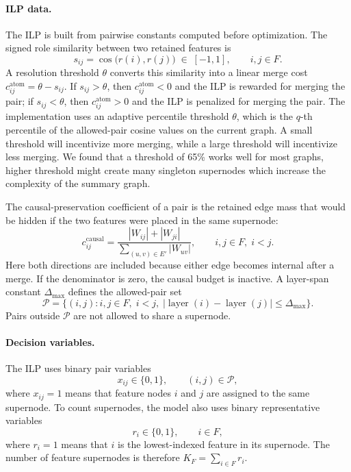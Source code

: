 \documentclass[../main.tex]{subfiles}
\begin{document}
\paragraph{ILP data.}
The ILP is built from pairwise constants computed before optimization. The signed
role similarity between two retained features is
\begin{equation}
s_{ij} =
\cos\bigl(r(i), r(j)\bigr)
\;\in\; [-1,1],
\qquad i,j \in F.
\label{eq:sim}
\end{equation}
A resolution threshold $\theta$ converts this similarity into a linear merge cost
$c^{\text{atom}}_{ij} = \theta - s_{ij}$. If $s_{ij} > \theta$, then
$c^{\text{atom}}_{ij} < 0$ and the ILP is rewarded for merging the pair; if
$s_{ij} < \theta$, then $c^{\text{atom}}_{ij} > 0$ and the ILP is penalized for
merging the pair. The implementation uses an adaptive percentile threshold $\theta$, 
which is the $q$-th percentile of the allowed-pair cosine values on the current graph.
A small threshold will incentivize more merging, while a large threshold will incentivize less merging.
We found that a threshold of 65\% works well for most graphs, higher threshold might create many singleton supernodes which increase the complexity of the summary graph.

The causal-preservation coefficient of a pair is the retained edge mass that would
be hidden if the two features were placed in the same supernode:
\begin{equation}
c^{\text{causal}}_{ij}
=
\frac{|W_{ij}| + |W_{ji}|}
     {\sum_{(u,v)\in E'} |W_{uv}|},
\qquad i,j \in F,\; i<j.
\label{eq:causal-coeff}
\end{equation}
Here both directions are included because either edge becomes internal after a
merge. If the denominator is zero, the causal budget is inactive. A layer-span
constant $\Delta_{\max}$ defines the allowed-pair set
\begin{equation}
\mathcal{P}
=
\{(i,j): i,j \in F,\; i<j,\;
|\operatorname{layer}(i)-\operatorname{layer}(j)| \le \Delta_{\max}\}.
\label{eq:allowed-pairs}
\end{equation}
Pairs outside $\mathcal{P}$ are not allowed to share a supernode.

\paragraph{Decision variables.}
The ILP uses binary pair variables
\begin{equation}
x_{ij} \in \{0,1\},
\qquad (i,j) \in \mathcal{P},
\label{eq:x-variable}
\end{equation}
where $x_{ij}=1$ means that feature nodes $i$ and $j$ are assigned to the same
supernode. To count supernodes, the model also uses binary representative
variables
\begin{equation}
r_i \in \{0,1\},
\qquad i \in F,
\label{eq:r-variable}
\end{equation}
where $r_i=1$ means that $i$ is the lowest-indexed feature in its supernode. The
number of feature supernodes is therefore $K_F = \sum_{i\in F} r_i$.
\end{document}
